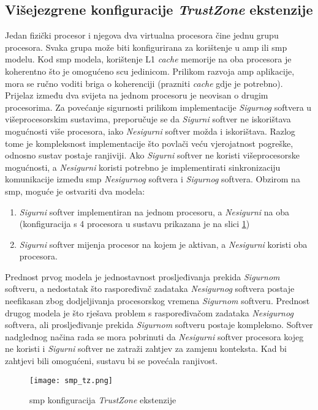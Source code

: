 \documentclass[times, utf8, diplomski, numeric]{fer}
\begin{document}
\subsection{Višejezgrene konfiguracije \textit{TrustZone} ekstenzije}
Jedan fizički procesor i njegova dva virtualna procesora čine jednu grupu procesora. Svaka grupa može biti konfigurirana za
korištenje u \gls{amp} ili \gls{smp} modelu. Kod \gls{smp} modela, korištenje L1 \textit{cache} memorije na oba procesora je koherentno što
je omogućeno \gls{scu} jedinicom. Prilikom razvoja \gls{amp} aplikacije, mora se ručno voditi briga o koherenciji (prazniti \textit{cache}
gdje je potrebno). Prijelaz između dva svijeta na jednom procesoru je neovisan o drugim procesorima. Za povećanje sigurnosti
prilikom implementacije \textit{Sigurnog} softvera u višeprocesorskim sustavima, preporučuje se da \textit{Sigurni} softver ne iskorištava
mogućnosti više procesora, iako \textit{Nesigurni} softver možda i iskorištava. Razlog tome je kompleksnost implementacije što povlači
veću vjerojatnost pogreške, odnosno sustav postaje ranjiviji. Ako \textit{Sigurni} softver ne koristi višeprocesorske mogućnosti,
a \textit{Nesigurni} koristi potrebno je implementirati sinkronizaciju komunikacije između \gls{smp} \textit{Nesigurnog} softvera i \textit{Sigurnog} softvera.
Obzirom na \gls{smp}, moguće je ostvariti dva modela:
\begin{enumerate}
  \item{\textit{Sigurni} softver implementiran na jednom procesoru, a \textit{Nesigurni} na oba (konfiguracija s 4 procesora u sustavu prikazana
  je na slici \ref{smp_tz})}
  \item{\textit{Sigurni} softver mijenja procesor na kojem je aktivan, a \textit{Nesigurni} koristi oba procesora.}
\end{enumerate}
Prednost prvog modela je jednostavnost prosljeđivanja prekida \textit{Sigurnom} softveru, a nedostatak što raspoređivač zadataka
\textit{Nesigurnog} softvera postaje neefikasan zbog dodjeljivanja procesorskog vremena \textit{Sigurnom} softveru. Prednost drugog modela je
što rješava problem s raspoređivačom zadataka \textit{Nesigurnog} softvera, ali prosljeđivanje prekida \textit{Sigurnom} softveru postaje
kompleksno. Softver nadglednog načina rada se mora pobrinuti da \textit{Nesigurni} softver procesora kojeg ne koristi i \textit{Sigurni} softver
ne zatraži zahtjev za zamjenu konteksta. Kad bi zahtjevi bili omogućeni, sustavu bi se povećala ranjivost.
\begin{figure}[H]
  \centering
	\texttt{[image: smp\_tz.png]}%
	\caption{\gls{smp} konfiguracija \textit{TrustZone} ekstenzije \cite{tz_wp}}
	\label{smp_tz}%
\end{figure}
\end{document}
